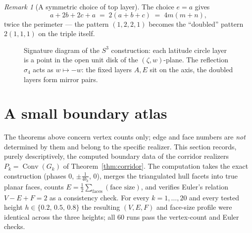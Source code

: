 \documentclass[11pt]{article}
\theoremstyle{definition}
\theoremstyle{remark}
\newtheorem{remark}[theorem]{Remark}
\newcommand{\Conv}{\operatorname{Conv}}
\begin{document}
\begin{remark}[A symmetric choice of top layer]\label{rem:topchoice}
The choice $e=a$ gives
\[
a+2b+2c+a \;=\; 2(a+b+c) \;=\; 4m(m+n),
\]
twice the perimeter --- the pattern $(1,2,2,1)$ becomes the ``doubled''
pattern $2(1,1,1)$ on the triple itself.
\end{remark}

\begin{figure}[ht]
\centering
{}
\caption{Signature diagram of the $S^3$ construction: each latitude circle
layer is a point in the open unit disk of the $(\zeta,w)$-plane. The
reflection $\sigma_4$ acts as $w\mapsto-w$: the fixed layers $A,E$ sit on
the axis, the doubled layers form mirror pairs.}
\label{fig:signature}
\end{figure}

\section{A small boundary atlas}\label{sec:atlas}

The theorems above concern vertex counts only; edge and face numbers are
\emph{not} determined by them and belong to the specific realizer. This
section records, purely descriptively, the computed boundary data of the
corridor realizers $P_k=\Conv(G_k)$ of Theorem~\ref{thm:corridor}. The
computation takes the exact construction (phases $0$, $\pm\tfrac1{4b_k}$,
$0$), merges the triangulated hull facets into true planar faces, counts
$E=\tfrac12\sum_{\text{faces}}(\text{face size})$, and verifies Euler's
relation $V-E+F=2$ as a consistency check. For every
$k=1,\dots,20$ and every tested height $h\in\{0.2,\,0.5,\,0.8\}$ the
resulting $(V,E,F)$ and face-size profile were identical across the three
heights; all $60$ runs pass the vertex-count and Euler checks.
\end{document}
